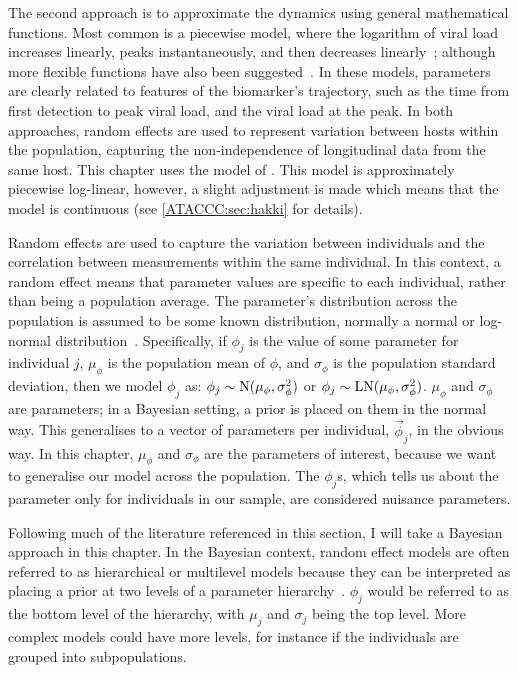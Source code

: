 \documentclass[thesis.tex]{subfiles}
\begin{document}
The second approach is to approximate the dynamics using general mathematical functions.
Most common is a piecewise model, where the logarithm of viral load increases linearly, peaks instantaneously, and then decreases linearly~\autocites{clearyUsing,kisslerViral,larremoreTest}; although more flexible functions have also been suggested~\autocites{quiltyQuarantine}.
In these models, parameters are clearly related to features of the biomarker's trajectory, such as the time from first detection to peak viral load, and the viral load at the peak.
In both approaches, random effects are used to represent variation between hosts within the population, capturing the non-independence of longitudinal data from the same host.
This chapter uses the model of \textcite{hakkiOnset}.
This model is approximately piecewise log-linear, however, a slight adjustment is made which means that the model is continuous (see \cref{ATACCC:sec:hakki} for details).

Random effects are used to capture the variation between individuals and the correlation between measurements within the same individual.
In this context, a random effect means that parameter values are specific to each individual, rather than being a population average.
The parameter's distribution across the population is assumed to be some known distribution, normally a normal or log-normal distribution~\autocite[chapter 24]{lashModern}.
Specifically, if $\phi_j$ is the value of some parameter for individual $j$, $\mu_\phi$ is the population mean of $\phi$, and $\sigma_\phi$ is the population standard deviation, then we model $\phi_j$ as: $\phi_j \sim \operatorname{N}(\mu_\phi, \sigma_\phi^2)$ or $\phi_j \sim \operatorname{LN}(\mu_\phi, \sigma_\phi^2)$.
$\mu_\phi$ and $\sigma_\phi$ are parameters; in a Bayesian setting, a prior is placed on them in the normal way.
This generalises to a vector of parameters per individual, $\vec{\phi}_j$, in the obvious way.
In this chapter, $\mu_\phi$ and $\sigma_\phi$ are the parameters of interest, because we want to generalise our model across the population.
The $\phi_j$s, which tells us about the parameter only for individuals in our sample, are considered nuisance parameters.

Following much of the literature referenced in this section, I will take a Bayesian approach in this chapter.
In the Bayesian context, random effect models are often referred to as hierarchical or multilevel models because they can be interpreted as placing a prior at two levels of a parameter hierarchy~\autocite[chapter 5]{gelmanBDA}.
$\phi_j$ would be referred to as the bottom level of the hierarchy, with $\mu_j$ and $\sigma_j$ being the top level.
More complex models could have more levels, for instance if the individuals are grouped into subpopulations.
\end{document}
